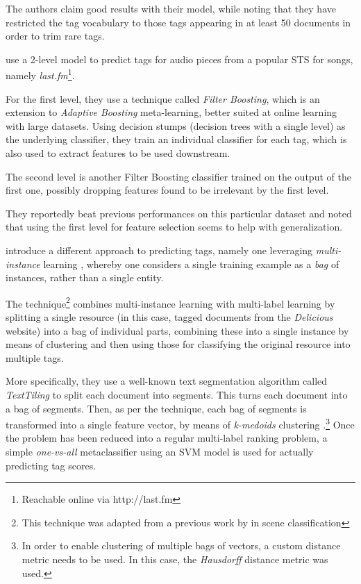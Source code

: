 The authors claim good results with their model, while noting that they have restricted the tag vocabulary to those tags appearing in at least 50 documents in order to trim rare tags.

\citet{bertin-mahieux_etal_2008} use a 2-level model to predict tags for audio pieces from a popular STS for songs, namely \textit{last.fm}\footnote{Reachable online via http://last.fm}.

For the first level, they use a technique called \textit{Filter Boosting}, which is an extension to \textit{Adaptive Boosting} meta-learning, better suited at online learning with large datasets. 
Using decision stumps (decision trees with a single level) as the underlying classifier, they train an individual classifier for each tag, which is also used to extract features to be used downstream.

The second level is another Filter Boosting classifier trained on the output of the first one, possibly dropping features found to be irrelevant by the first level.

They reportedly beat previous performances on this particular dataset and noted that using the first level for feature selection seems to help with generalization.

\cite{shen_etal_2009} introduce a different approach to predicting tags, namely one leveraging \textit{multi-instance} learning \citep{dietterich_etal_1997}, whereby one considers a single training example as a \textit{bag} of instances, rather than a single entity.

The technique\footnote{This technique was adapted from a previous work by \cite{zhou_zhang_2006} in scene classification} combines multi-instance learning with multi-label learning by splitting a single resource (in this case, tagged documents from the \textit{Delicious} website) into a bag of individual parts, combining these into a single instance by means of clustering and then using those for classifying the original resource into multiple tags.

More specifically, they use a well-known text segmentation algorithm called \textit{TextTiling} \citep{hearst_1994} to split each document into segments. This turns each document into a bag of segments. Then, as per the technique, each bag of segments is transformed into a single feature vector, by means of \textit{k-medoids} clustering \citep{kaufmanl_rousseeuw_1987}.\footnote{In order to enable clustering of multiple bags of vectors, a custom distance metric needs to be used. In this case, the  \textit{Hausdorff} distance metric \citep{huttenlocher_etal_1993} was used.} Once the problem has been reduced into a regular multi-label ranking problem, a simple \textit{one-vs-all} metaclassifier using an SVM model is used for actually predicting  tag scores.

